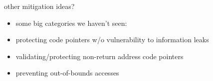 \begin{frame}{other mitigation ideas?}
    \begin{itemize}
    \item some big categories we haven't seen:
    \vspace{.5cm}
    \item protecting code pointers w/o vulnerability to information leaks
    \item validating/protecting non-return address code pointers
    \item preventing out-of-bounds accesses
    \end{itemize}
\end{frame}
